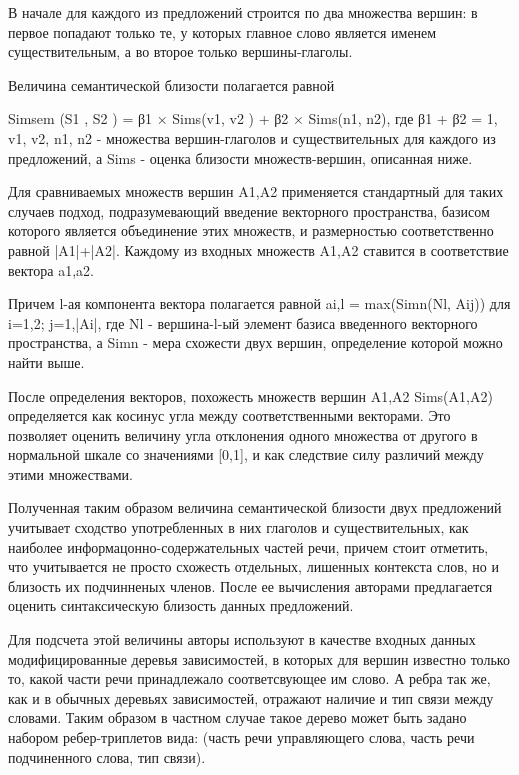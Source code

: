 В начале для каждого из предложений строится по два множества вершин:
в первое попадают только те, у которых главное слово является именем существительным,
а во второе только вершины-глаголы.

Величина семантической близости полагается равной

Simsem (S1 , S2 ) = β1 × Sims(v1, v2 ) + β2 × Sims(n1, n2), где 
β1 + β2 = 1, 
v1, v2, n1, n2 - множества вершин-глаголов и существительных для каждого из предложений,
а Sims - оценка близости множеств-вершин, описанная ниже.

Для сравниваемых множеств вершин A1,A2 применяется стандартный для таких случаев подход,
подразумевающий введение векторного пространства, базисом которого является объединение этих множеств,
и размерностью соответственно равной |A1|+|A2|.  
Каждому из входных множеств A1,A2 ставится в соответствие вектора a1,a2.

Причем l-ая компонента вектора полагается равной 
ai,l = max(Simn(Nl, Aij)) 
для i=1,2; j=1,|Ai|,
где Nl - вершина-l-ый элемент базиса введенного векторного пространства,
а Simn - мера схожести двух вершин, определение которой можно найти выше.

После определения векторов, похожесть множеств вершин A1,A2 Sims(A1,A2) определяется
как косинус угла между соответственными векторами. 
Это позволяет оценить величину угла отклонения одного множества от другого в нормальной шкале
со значениями [0,1], и как следствие силу различий между этими множествами.

Полученная таким образом величина семантической близости двух предложений
учитывает сходство употребленных в них глаголов и существительных,
как наиболее информацонно-содержательных частей речи, 
причем стоит отметить, что учитывается не просто схожесть 
отдельных, лишенных контекста слов, но и близость их 
подчинненых членов. После ее вычисления авторами предлагается оценить
синтаксическую близость данных предложений.

Для подсчета этой величины авторы используют в качестве входных данных
модифицированные деревья зависимостей, в которых для вершин известно только то, 
какой части речи принадлежало соответсвующее им слово.
А ребра так же, как и в обычных деревьях зависимостей, отражают
наличие и тип связи между словами.
Таким образом в частном случае такое дерево может быть задано
набором ребер-триплетов вида:
(часть речи управляющего слова, часть речи подчиненного слова, тип связи).

